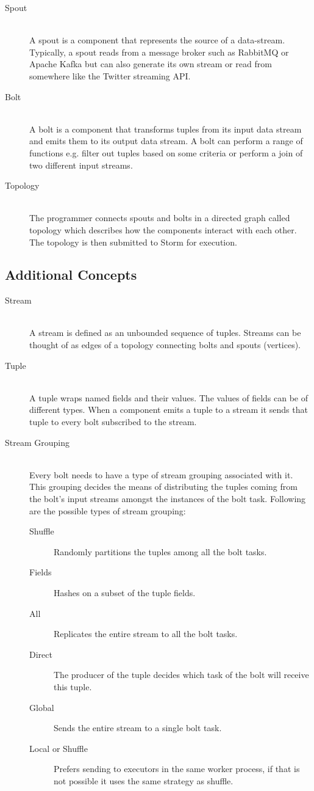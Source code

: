 \begin{description}
  \item[Spout] \hfill \\
  A spout is a component that represents the source of a data-stream. Typically, a spout reads from a message broker such as RabbitMQ \cite{RabbitMQ} or Apache Kafka \cite{ApacheKafka} but can also generate its own stream or read from somewhere like the Twitter streaming API.
  \item[Bolt] \hfill \\
  A bolt is a component that transforms tuples from its input data stream and emits them to its output data stream. A bolt can perform a range of functions e.g. filter out tuples based on some criteria or perform a join of two different input streams.
  \item[Topology] \hfill \\
  The programmer connects spouts and bolts in a directed graph called topology which describes how the components interact with each other. The topology is then submitted to Storm for execution.
\end{description}

\subsection{Additional Concepts}

\begin{description}
  \item[Stream] \hfill \\
  A stream is defined as an unbounded sequence of tuples. Streams can be thought of as edges of a topology connecting bolts and spouts (vertices).
  \item[Tuple] \hfill \\
  A tuple wraps named fields and their values. The values of fields can be of different types. When a component emits a tuple to a stream it sends that tuple to every bolt subscribed to the stream.
  \item[Stream Grouping] \hfill \\
  Every bolt needs to have a type of stream grouping associated with it. This grouping decides the means of distributing the tuples coming from the bolt's input streams amongst the instances of the bolt task. Following are the possible types of stream grouping:
  \begin{description}
  	\item[Shuffle] Randomly partitions the tuples among all the bolt tasks.
  	\item[Fields] Hashes on a subset of the tuple fields.
  	\item[All] Replicates the entire stream to all the bolt tasks.
  	\item[Direct] The producer of the tuple decides which task of the bolt will receive this tuple.
  	\item[Global] Sends the entire stream to a single bolt task.
  	\item[Local or Shuffle] Prefers sending to executors in the same worker process, if that is not possible it uses the same strategy as shuffle.
  \end{description}
\end{description}

